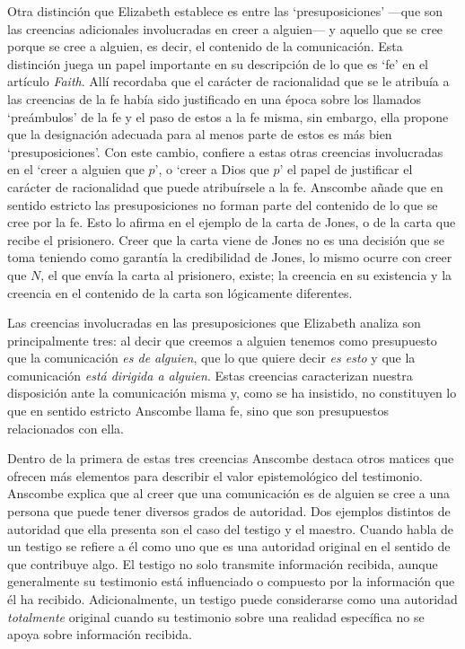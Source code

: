 Otra distinción que Elizabeth establece es entre las `presuposiciones' ---que son las creencias adicionales involucradas en creer a alguien--- y aquello que se cree porque se cree a alguien, es decir, el contenido de la comunicación. Esta distinción juega un papel importante en su descripción de lo que es `fe' en el artículo \emph{Faith}. Allí recordaba que el carácter de racionalidad que se le atribuía a las creencias de la fe había sido justificado en una época sobre los llamados `preámbulos' de la fe y el paso de estos a la fe misma, sin embargo, ella propone que la designación adecuada para al menos parte de estos es más bien `presuposiciones'. Con este cambio, confiere a estas otras creencias involucradas en el `creer a alguien que $p$', o `creer a Dios que $p$' el papel de justificar el carácter de racionalidad que puede atribuírsele a la fe. Anscombe añade que en sentido estricto las presuposiciones no forman parte del contenido de lo que se cree por la fe. Esto lo afirma en el ejemplo de la carta de Jones, o de la carta que recibe el prisionero. Creer que la carta viene de Jones no es una decisión que se toma teniendo como garantía la credibilidad de Jones, lo mismo ocurre con creer que $N$, el que envía la carta al prisionero, existe; la creencia en su existencia y la creencia en el contenido de la carta son lógicamente diferentes.

Las creencias involucradas en las presuposiciones que Elizabeth analiza son principalmente tres: al decir que creemos a alguien tenemos como presupuesto que la comunicación \emph{es de alguien}, que lo que quiere decir \emph{es esto} y que la comunicación \emph{está dirigida a alguien}. Estas creencias caracterizan nuestra disposición ante la comunicación misma y, como se ha insistido, no constituyen lo que en sentido estricto Anscombe llama fe, sino que son presupuestos relacionados con ella.

Dentro de la primera de estas tres creencias Anscombe destaca otros matices que ofrecen más elementos para describir el valor epistemológico del testimonio. Anscombe explica que al creer que una comunicación es de alguien se cree a una persona que puede tener diversos grados de autoridad. Dos ejemplos distintos de autoridad que ella presenta son el caso del testigo y el maestro. Cuando habla de un testigo se refiere a él como uno que es una autoridad original en el sentido de que contribuye algo. El testigo no solo transmite información recibida, aunque generalmente su testimonio está influenciado o compuesto por la información que él ha recibido. Adicionalmente, un testigo puede considerarse como una autoridad \emph{totalmente} original cuando su testimonio sobre una realidad específica no se apoya sobre información recibida.


